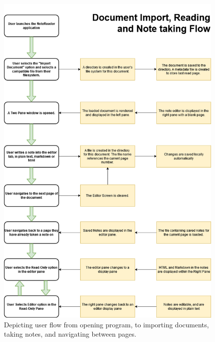 \begin{figure}
    \centering
    \includegraphics[width=1\linewidth]{Figures/Document_Import_Reading_NoteTaking_Flow(2).drawio.png}
    \caption{Depicting user flow from opening program, to importing documents, taking notes, and navigating between pages. }
    \label{fig:Document Import, Reading and Note taking Flow}
\end{figure}

